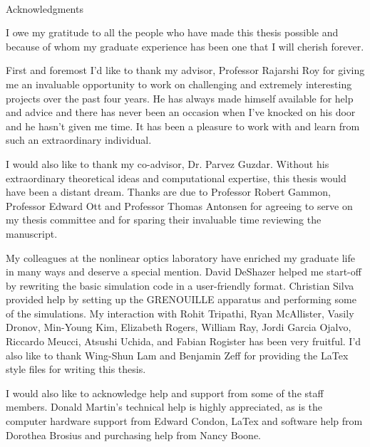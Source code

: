 
\renewcommand{\baselinestretch}{2}
\small\normalsize
\hbox{\ }
 
\vspace{-.65in}

\begin{center}
\large{Acknowledgments} 
\end{center} 

\vspace{1ex}

I owe my gratitude to all the people who have made this thesis possible and because of whom my graduate experience has been one that I will cherish forever.

First and foremost I'd like to thank my advisor, Professor Rajarshi Roy for giving me an invaluable opportunity to work on challenging and extremely interesting projects over the past four years. He has always made himself available for help and advice and there has never been an occasion when I've knocked on his door and he hasn't given me time. It has been a pleasure to work with and learn from such an extraordinary individual.

I would also like to thank my co-advisor, Dr. Parvez Guzdar. Without his extraordinary theoretical ideas and computational expertise, this thesis would have been a distant dream. Thanks are due to Professor Robert Gammon, Professor Edward Ott and Professor Thomas Antonsen for agreeing to serve on my thesis committee and for sparing their invaluable time reviewing the manuscript.

My colleagues at the nonlinear optics laboratory have enriched my graduate life in many ways and deserve a special mention. David DeShazer helped me start-off by rewriting the basic simulation code in a user-friendly format. Christian Silva provided help by setting up the GRENOUILLE apparatus and performing some of the simulations. My interaction with  Rohit Tripathi, Ryan McAllister, Vasily Dronov, Min-Young Kim, Elizabeth Rogers, William Ray, Jordi Garcia Ojalvo, Riccardo Meucci, Atsushi Uchida, and Fabian Rogister has been very fruitful. I'd also like to thank Wing-Shun Lam and Benjamin Zeff for providing the LaTex style files for writing this thesis.

I would also like to acknowledge help and support from some of the staff members. Donald Martin's technical help is highly appreciated, as is the computer hardware support from Edward Condon, LaTex and software help from Dorothea Brosius and purchasing help from Nancy Boone.

